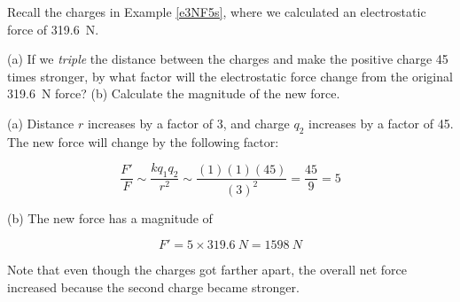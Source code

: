 \documentclass[dvipsnames]{article}
\numberwithin{equation}{section}
\numberwithin{figure}{section}
\begin{document}
\begin{example}
Recall the charges in Example \ref{e3NF5s}, where we calculated an electrostatic force of \SI{319.6}{N}.
\vspace{-1em}

\begin{center}
\end{center}

(a) If we \textit{triple} the distance between the charges and make the positive charge 45 times stronger, by what factor will the electrostatic force change from the original \SI{319.6}{N} force? (b) Calculate the magnitude of the new force.
\end{example}

\Solution (a) Distance $r$ increases by a factor of 3, and charge $q_2$ increases by a factor of 45. The new force will change by the following factor:

\begin{equation*}
    \frac{F'}{F} \sim \frac{k q_1 q_2}{r^2} \sim \frac{(1)(1)(45)}{(3)^2} = \frac{45}{9} = 5
\end{equation*}

(b) The new force has a magnitude of 

\begin{equation*}
    F' = 5 \times \SI{319.6}{N} = \SI{1598}{N}
\end{equation*}

Note that even though the charges got farther apart, the overall net force increased because the second charge became stronger.
\end{document}
